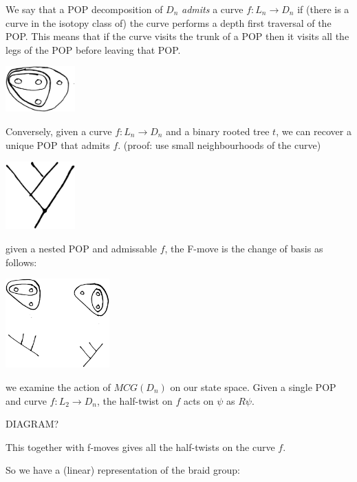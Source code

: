 \documentclass[12pt,a4paper]{article}
\begin{document}
We say that a POP decomposition of $D_n$
{\it admits} a curve $f:L_n\to D_n$
if (there is a curve in the isotopy class of)
the curve performs a depth first traversal of the POP.
This means that if the curve visits the trunk of a POP
then it visits all the legs of the POP before leaving that POP.

\begin{center}
\includegraphics[width=0.2\textwidth]{POP-2.eps}
\end{center}

Conversely, given a curve $f:L_n\to D_n$
and a binary rooted tree $t$,
we can recover a unique POP that admits $f$.
(proof: use small neighbourhoods of the curve)

\begin{center}
\includegraphics[width=0.2\textwidth]{POP-3.eps}
\end{center}

 given a nested POP and admissable $f$,
the F-move is the change of basis as follows:

\begin{center}
\includegraphics[width=0.3\textwidth]{POP-4.eps}
\end{center}

 we examine the action of $MCG(D_n)$
on our state space. Given a single POP and curve $f:L_2\to D_n$,
the half-twist on $f$ acts on $\psi$ as $R\psi$.

DIAGRAM?

This together with f-moves gives all the half-twists on
the curve $f$.

So we have a (linear) representation of the braid group:
\end{document}
